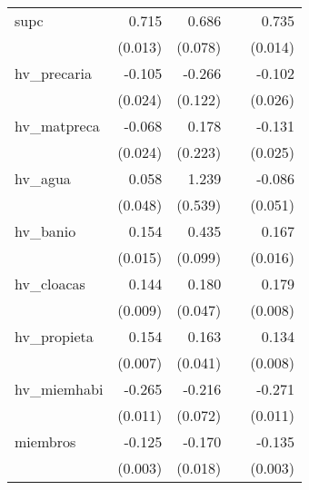 {\begin{longtable}{l*{4}{D{.}{.}{-1}}}
\addlinespace
supc        &       0.715\sym{***}&       0.686\sym{***}&                     &       0.735\sym{***}\\
            &     (0.013)         &     (0.078)         &                     &     (0.014)         \\
\addlinespace
hv\_precaria &      -0.105\sym{***}&      -0.266\sym{*}  &                     &      -0.102\sym{***}\\
            &     (0.024)         &     (0.122)         &                     &     (0.026)         \\
\addlinespace
hv\_matpreca &      -0.068\sym{**} &       0.178         &                     &      -0.131\sym{***}\\
            &     (0.024)         &     (0.223)         &                     &     (0.025)         \\
\addlinespace
hv\_agua     &       0.058         &       1.239\sym{*}  &                     &      -0.086         \\
            &     (0.048)         &     (0.539)         &                     &     (0.051)         \\
\addlinespace
hv\_banio    &       0.154\sym{***}&       0.435\sym{***}&                     &       0.167\sym{***}\\
            &     (0.015)         &     (0.099)         &                     &     (0.016)         \\
\addlinespace
hv\_cloacas  &       0.144\sym{***}&       0.180\sym{***}&                     &       0.179\sym{***}\\
            &     (0.009)         &     (0.047)         &                     &     (0.008)         \\
\addlinespace
hv\_propieta &       0.154\sym{***}&       0.163\sym{***}&                     &       0.134\sym{***}\\
            &     (0.007)         &     (0.041)         &                     &     (0.008)         \\
\addlinespace
hv\_miemhabi &      -0.265\sym{***}&      -0.216\sym{**} &                     &      -0.271\sym{***}\\
            &     (0.011)         &     (0.072)         &                     &     (0.011)         \\
\addlinespace
miembros    &      -0.125\sym{***}&      -0.170\sym{***}&                     &      -0.135\sym{***}\\
            &     (0.003)         &     (0.018)         &                     &     (0.003)         \\

\end{longtable}}
